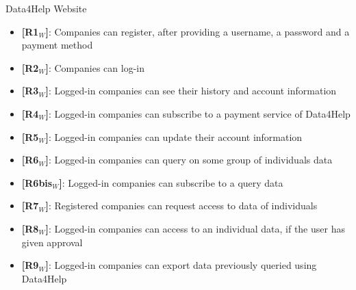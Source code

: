 \noindent Data4Help Website
\begin{itemize}
    \item \textbf{[R1$_W$]}: Companies can register, after providing a username, a password and a payment method
    \item \textbf{[R2$_W$]}: Companies can log-in
    \item \textbf{[R3$_W$]}: Logged-in companies can see their history and account information
    \item \textbf{[R4$_W$]}: Logged-in companies can subscribe to a payment service of Data4Help
    \item \textbf{[R5$_W$]}: Logged-in companies can update their account information
    \item \textbf{[R6$_W$]}: Logged-in companies can query on some group of individuals data
    \item \textbf{[R6bis$_W$]}: Logged-in companies can subscribe to a query data
    \item \textbf{[R7$_W$]}: Registered companies can request access to data of individuals
    \item \textbf{[R8$_W$]}: Logged-in companies can access to an individual data, if the user has given approval
    \item \textbf{[R9$_W$]}: Logged-in companies can export data previously queried using Data4Help
    
\end{itemize}

